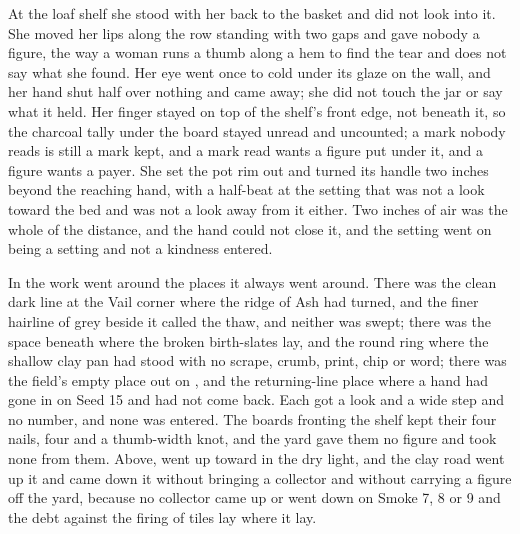\scenebreak

At the loaf shelf she stood with her back to the basket and did not look into it. She moved her lips along the row standing with two gaps and gave nobody a figure, the way a woman runs a thumb along a hem to find the tear and does not say what she found. Her eye went once to  cold under its glaze on the wall, and her hand shut half over nothing and came away; she did not touch the jar or say what it held. Her finger stayed on top of the shelf's front edge, not beneath it, so the charcoal tally under the board stayed unread and uncounted; a mark nobody reads is still a mark kept, and a mark read wants a figure put under it, and a figure wants a payer. She set the pot rim out and turned its handle two inches beyond the reaching hand, with a half-beat at the setting that was not a look toward the bed and was not a look away from it either. Two inches of air was the whole of the distance, and the hand could not close it, and the setting went on being a setting and not a kindness entered.

In  the work went around the places it always went around. There was the clean dark line at the Vail corner where the ridge of Ash had turned, and the finer hairline of grey beside it called the thaw, and neither was swept; there was the space beneath  where the broken birth-slates lay, and the round ring where the shallow clay pan had stood with no scrape, crumb, print, chip or word; there was the field's empty place out on , and the returning-line place where a hand had gone in on Seed 15 and had not come back. Each got a look and a wide step and no number, and none was entered. The boards fronting the shelf kept their four nails, four and a thumb-width knot, and the yard gave them no figure and took none from them. Above,  went up toward  in the dry light, and the clay road went up it and came down it without bringing a collector and without carrying a figure off the yard, because no collector came up or went down on Smoke 7, 8 or 9 and the debt against the firing of tiles lay where it lay.

